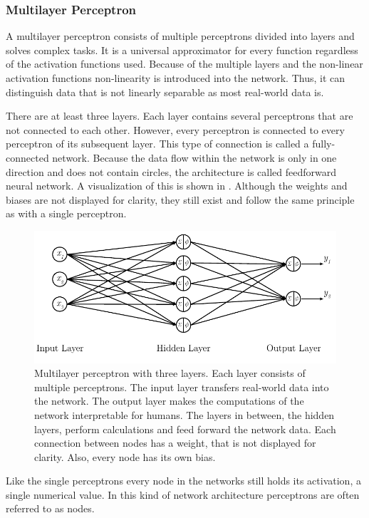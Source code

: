 \subsubsection{Multilayer Perceptron}
\label{sec:mlp-multilayer-perceptron}
A multilayer perceptron consists of multiple perceptrons divided into layers and solves complex tasks\cite{Bishop1995}.
It is a universal approximator for every function\cite{Cybenko1989} regardless of the activation functions used\cite{Hornik1991}.
Because of the multiple layers and the non-linear activation functions non-linearity is introduced into the network.
Thus, it can distinguish data that is not linearly separable as most real-world data is.

There are at least three layers.
Each layer contains several perceptrons that are not connected to each other.
However, every perceptron is connected to every perceptron of its subsequent layer.
This type of connection is called a fully-connected network.
Because the data flow within the network is only in one direction and does not contain circles, the architecture is called feedforward neural network.
A visualization of this is shown in .
Although the weights and biases are not displayed for clarity, they still exist and follow the same principle as with a single perceptron.
\begin{figure}
	\centering
	\includegraphics{images/multilayer-perceptron}
	\caption[Multilayer perceptron]{Multilayer perceptron with three layers. Each layer consists of multiple perceptrons. The input layer transfers real-world data into the network. The output layer makes the computations of the network interpretable for humans. The layers in between, the hidden layers, perform calculations and feed forward the network data. Each connection between nodes has a weight, that is not displayed for clarity. Also, every node has its own bias.}
	\label{fig:multilayer-perceptron}
\end{figure}
Like the single perceptrons every node in the networks still holds its activation, a single numerical value.
In this kind of network architecture perceptrons are often referred to as nodes.

